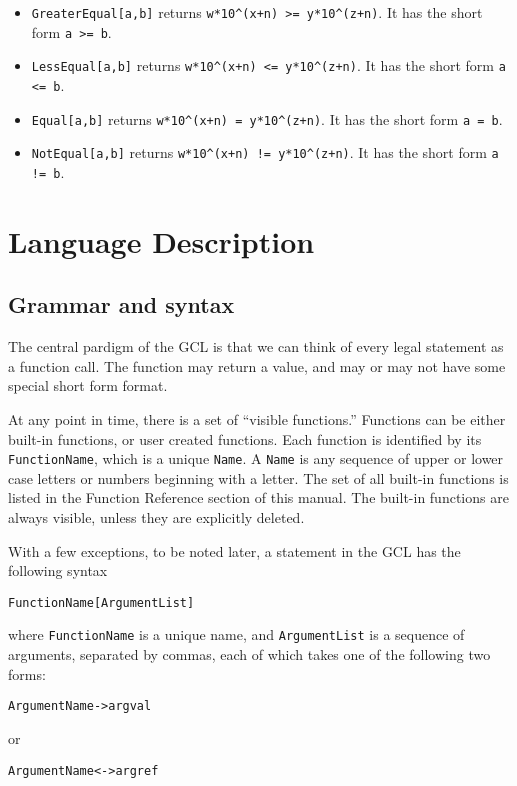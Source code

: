 \begin{itemize}
\item
\verb+GreaterEqual[a,b]+ returns \verb&w*10^(x+n) >= y*10^(z+n)&.
It has the short form \verb+a >= b+.

\item 
\verb+LessEqual[a,b]+ returns \verb&w*10^(x+n) <= y*10^(z+n)&.
It has the short form \verb+a <= b+.

\item 
\verb+Equal[a,b]+ returns \verb&w*10^(x+n) = y*10^(z+n)&.
It has the short form \verb+a = b+.

\item 
\verb+NotEqual[a,b]+ returns \verb&w*10^(x+n) != y*10^(z+n)&.
It has the short form \verb+a != b+.

\ed
\end{itemize}

\chapter{Language Description}

\section{Grammar and syntax}

The central pardigm of the GCL is that we can think of every legal
statement as a function call.  The function may return a value, and
may or may not have some special short form format.

At any point in time, there is a set of ``visible functions.''
Functions can be either built-in functions, or user created functions.
Each function is identified by its \verb+FunctionName+, which is a
unique \verb+Name+.  A \verb+Name+ is any sequence of upper or lower
case letters or numbers beginning with a letter.  The set of all
built-in functions is listed in the Function Reference section of this
manual.  The built-in functions are always visible, unless they are
explicitly deleted.

With a few exceptions, to be noted later, a statement in the GCL has the
following syntax
\begin{verbatim}
FunctionName[ArgumentList]
\end{verbatim}
where \verb+FunctionName+ is a unique name, and \verb+ArgumentList+ is
a sequence of arguments, separated by commas, each of which takes one
of the following two forms:
\begin{verbatim}
ArgumentName->argval
\end{verbatim}
or
\begin{verbatim}
ArgumentName<->argref
\end{verbatim}

